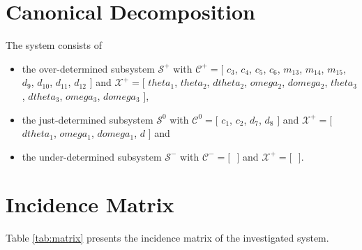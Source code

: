 \documentclass[a4,11pt]{article}
\begin{document}
\section{Canonical Decomposition}The system consists of
\begin{itemize}	\item the over-determined subsystem $\mathcal{S}^+$ with $\mathcal{C}^+ = [$ $c_3$, $c_4$, $c_5$, $c_6$, $m_{13}$, $m_{14}$, $m_{15}$, $d_9$, $d_{10}$, $d_{11}$, $d_{12} $ $]$ and $\mathcal{X}^+ = [$ $theta_1$, $theta_2$, $dtheta_2$, $omega_2$, $domega_2$, $theta_3$, $dtheta_3$, $omega_3$, $domega_3 $ $]$,
	\item the just-determined subsystem $\mathcal{S}^0$ with $\mathcal{C}^0 = [$ $c_1$, $c_2$, $d_7$, $d_8 $ $]$ and $\mathcal{X}^+ = [$ $dtheta_1$, $omega_1$, $domega_1$, $d $ $]$ and
	\item the under-determined subsystem $\mathcal{S}^-$ with $\mathcal{C}^- = [$ $ $ $]$ and $\mathcal{X}^+ = [$ $ $ $]$.
\end{itemize}
\section{Incidence Matrix}
Table \ref{tab:matrix} presents the incidence matrix of the investigated system.\setlength\tabcolsep{2mm}
\end{document}
